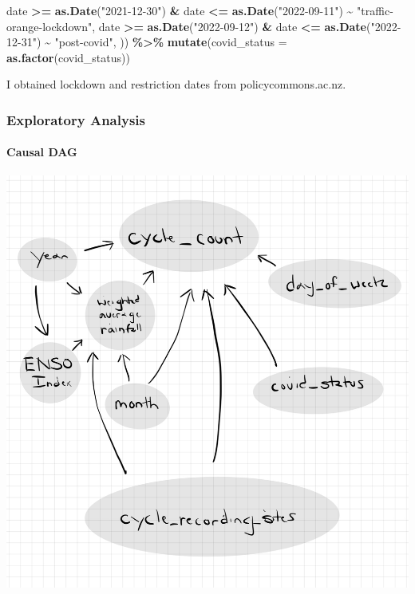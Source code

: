 \documentclass[
]{article}
\newenvironment{Shaded}{\begin{snugshade}}{\end{snugshade}}
\newcommand{\AttributeTok}[1]{\textcolor[rgb]{0.13,0.29,0.53}{#1}}
\newcommand{\FunctionTok}[1]{\textcolor[rgb]{0.13,0.29,0.53}{\textbf{#1}}}
\newcommand{\NormalTok}[1]{#1}
\newcommand{\SpecialCharTok}[1]{\textcolor[rgb]{0.81,0.36,0.00}{\textbf{#1}}}
\newcommand{\StringTok}[1]{\textcolor[rgb]{0.31,0.60,0.02}{#1}}
\begin{document}
\begin{Shaded}
\begin{Highlighting}[]
\NormalTok{    date }\SpecialCharTok{\textgreater{}=} \FunctionTok{as.Date}\NormalTok{(}\StringTok{"2021{-}12{-}30"}\NormalTok{) }\SpecialCharTok{\&}\NormalTok{ date }\SpecialCharTok{\textless{}=} \FunctionTok{as.Date}\NormalTok{(}\StringTok{"2022{-}09{-}11"}\NormalTok{) }\SpecialCharTok{\textasciitilde{}} \StringTok{"traffic{-}orange{-}lockdown"}\NormalTok{,}
\NormalTok{    date }\SpecialCharTok{\textgreater{}=} \FunctionTok{as.Date}\NormalTok{(}\StringTok{"2022{-}09{-}12"}\NormalTok{) }\SpecialCharTok{\&}\NormalTok{ date }\SpecialCharTok{\textless{}=} \FunctionTok{as.Date}\NormalTok{(}\StringTok{"2022{-}12{-}31"}\NormalTok{) }\SpecialCharTok{\textasciitilde{}} \StringTok{"post{-}covid"}\NormalTok{,}
\NormalTok{  )) }\SpecialCharTok{\%\textgreater{}\%}
  \FunctionTok{mutate}\NormalTok{(}\AttributeTok{covid\_status =} \FunctionTok{as.factor}\NormalTok{(covid\_status))}
\end{Highlighting}
\end{Shaded}

I obtained lockdown and restriction dates from policycommons.ac.nz.

\hypertarget{exploratory-analysis}{%
\subsubsection{Exploratory Analysis}\label{exploratory-analysis}}

\hypertarget{causal-dag}{%
\paragraph{Causal DAG}\label{causal-dag}}

\includegraphics[width=19.54in]{data/cycle_count_causal_DAG}
\end{document}
